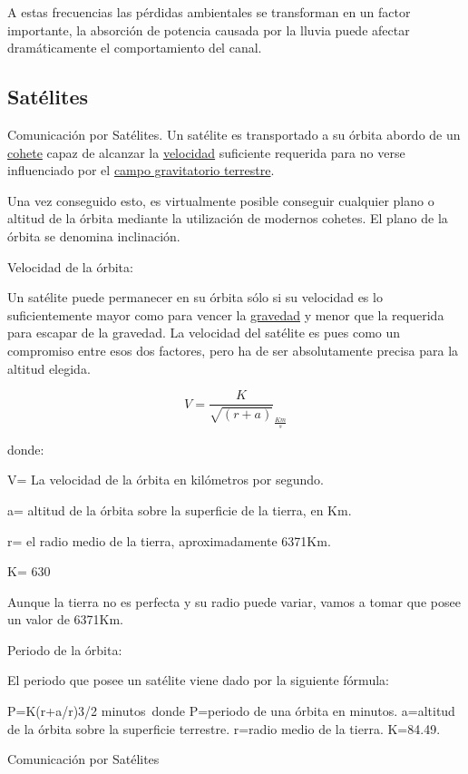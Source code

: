 \documentclass[a4paper]{article}
\begin{document}
A estas frecuencias las pérdidas ambientales se transforman en un factor
importante, la absorción de potencia causada por la lluvia puede afectar
dramáticamente el comportamiento del canal.

\subsection{Sat\'elites}

Comunicación por Satélites. Un satélite es transportado a su órbita
abordo de un \href{https://www.ecured.cu/Cohete}{cohete} capaz de
alcanzar la \href{https://www.ecured.cu/Velocidad}{velocidad} suficiente
requerida para no verse influenciado por
el \href{https://www.ecured.cu/index.php?title=Campo_gravitatorio_terrestre\&action=edit\&redlink=1}{campo
gravitatorio terrestre}.

Una vez conseguido esto, es virtualmente posible conseguir cualquier
plano o altitud de la órbita mediante la utilización de modernos
cohetes. El plano de la órbita se denomina inclinación.

Velocidad de la órbita:

Un satélite puede permanecer en su órbita sólo si su velocidad es lo
suficientemente mayor como para vencer
la \href{https://www.ecured.cu/Gravedad}{gravedad} y menor que la
requerida para escapar de la gravedad. La velocidad del satélite es pues
como un compromiso entre esos dos factores, pero ha de ser absolutamente
precisa para la altitud elegida.

$$V={\frac{K}{\sqrt{(r+a)}}}_{\frac{Km}{s}}$$

donde:

V= La velocidad de la órbita en kilómetros por segundo.

a= altitud de la órbita sobre la superficie de la tierra, en Km.

r= el radio medio de la tierra, aproximadamente 6371Km.

K= 630

Aunque la tierra no es perfecta y su radio puede variar, vamos a tomar
que posee un valor de 6371Km.

Periodo de la órbita:

El periodo que posee un satélite viene dado por la siguiente fórmula:

P=K(r+a/r)3/2 minutos~donde P=periodo de una órbita en minutos.
a=altitud de la órbita sobre la superficie terrestre. r=radio medio de
la tierra. K=84.49.

Comunicación por Satélites
\end{document}
